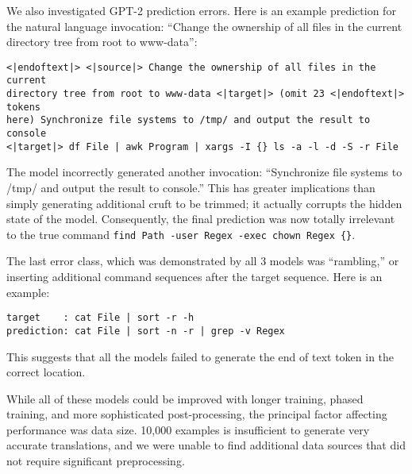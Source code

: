 \par
We also investigated GPT-2 prediction errors. Here is an example prediction for the natural language invocation: ``Change the ownership of all files in the current directory tree from root to www-data'':

\begin{verbatim}
<|endoftext|> <|source|> Change the ownership of all files in the current 
directory tree from root to www-data <|target|> (omit 23 <|endoftext|> tokens 
here) Synchronize file systems to /tmp/ and output the result to console 
<|target|> df File | awk Program | xargs -I {} ls -a -l -d -S -r File
\end{verbatim}
The model incorrectly generated another invocation: ``Synchronize file systems to /tmp/ and output the result to console.'' This has greater implications than simply generating additional cruft to be trimmed; it actually corrupts the hidden state of the model. Consequently, the final prediction was now totally irrelevant to the true command \texttt{find Path -user Regex -exec chown Regex \{\}}.
\par
The last error class, which was demonstrated by all 3 models was ``rambling,'' or inserting additional command sequences after the target sequence. Here is an example:
\begin{verbatim}
target    : cat File | sort -r -h 
prediction: cat File | sort -n -r | grep -v Regex
\end{verbatim}
This suggests that all the models failed to generate the end of text token in the correct location.
\par
While all of these models could be improved with longer training, phased training, and more sophisticated post-processing, the principal factor affecting performance was data size. 10,000 examples is insufficient to generate very accurate translations, and we were unable to find additional data sources that did not require significant preprocessing.
